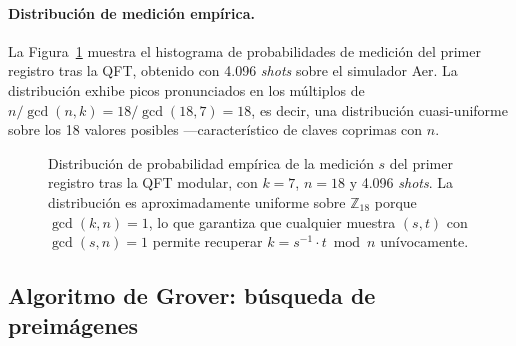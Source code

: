 \paragraph{Distribución de medición empírica.} La Figura~\ref{fig:dft_distribution} muestra el histograma de probabilidades de medición del primer registro tras la QFT, obtenido con 4.096 \emph{shots} sobre el simulador Aer. La distribución exhibe picos pronunciados en los múltiplos de $n / \gcd(n, k) = 18 / \gcd(18, 7) = 18$, es decir, una distribución cuasi-uniforme sobre los 18 valores posibles ---característico de claves coprimas con $n$.

\begin{figure}[htbp]
\centering
{}
\caption{Distribución de probabilidad empírica de la medición $s$ del primer registro tras la QFT modular, con $k = 7$, $n = 18$ y 4.096 \emph{shots}. La distribución es aproximadamente uniforme sobre $\mathbb{Z}_{18}$ porque $\gcd(k,n) = 1$, lo que garantiza que cualquier muestra $(s,t)$ con $\gcd(s,n)=1$ permite recuperar $k = s^{-1}\cdot t \bmod n$ unívocamente.}
\label{fig:dft_distribution}
\end{figure}

\subsection{Algoritmo de Grover: búsqueda de preimágenes}


